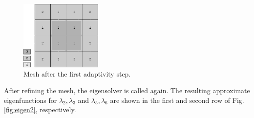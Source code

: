 \documentclass[preprint,12pt]{elsarticle}
\begin{document}
\begin{figure}[!ht]
\begin{center}
\includegraphics[width=0.36\textwidth]{img/mesh_2.png}
\end{center}
\vspace{-5mm}
\caption{Mesh after the first adaptivity step.}
\label{fig:mesh2}
\end{figure}

After refining the mesh, the eigensolver is called again. 
The resulting approximate eigenfunctions for $\lambda_2, \lambda_3$ and $\lambda_5, \lambda_6$
are shown in the first and second row of Fig. \ref{fig:eigen2}, respectively.
\end{document}
